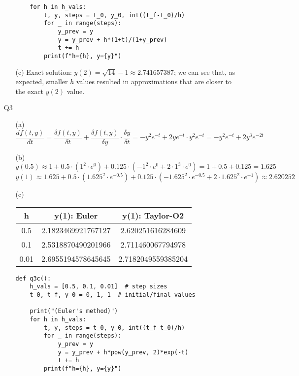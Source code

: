 \documentclass{article}
\begin{document}
\begin{itemize}
\begin{itemize}
\begin{verbatim}
    for h in h_vals:
        t, y, steps = t_0, y_0, int((t_f-t_0)/h)
        for _ in range(steps):
            y_prev = y
            y = y_prev + h*(1+t)/(1+y_prev)
            t += h
        print(f"h={h}, y={y}")
                    \end{verbatim}
              \item [(c)] Exact solution: $y(2)=\sqrt{14}-1\approx 2.741657387$; we can see that, as expected, smaller $h$ values resulted in approximations that are closer to the exact $y(2)$ value.
          \end{itemize}
    \item [Q3]
          \begin{itemize}
              \item [(a)] $\dfrac{df(t,y)}{dt}=\dfrac{\delta f(t,y)}{\delta t}+\dfrac{\delta f(t,y)}{\delta y}\cdot\dfrac{\delta y}{\delta t}=-y^2e^{-t}+2ye^{-t}\cdot y^2e^{-t}=\boxed{-y^2e^{-t}+2y^3e^{-2t}}$
              \item [(b)] $y(0.5)\approx 1+0.5\cdot(1^2\cdot e^0)+0.125\cdot(-1^2\cdot e^0+2\cdot 1^3\cdot e^0)=1+0.5+0.125=1.625$\\$y(1)\approx 1.625+0.5\cdot(1.625^2\cdot e^{-0.5})+0.125\cdot(-1.625^2\cdot e^{-0.5}+2\cdot 1.625^2\cdot e^{-1})\approx\boxed{2.620252}$
              \item [(c)]
                    \begin{tabular}{|c|c|c|}
                        \hline
                        h    & y(1): Euler        & y(1): Taylor-O2    \\
                        \hline
                        0.5  & 2.1823469921767127 & 2.620251616284609  \\
                        \hline
                        0.1  & 2.5318870490201966 & 2.711460067794978  \\
                        \hline
                        0.01 & 2.6955194578645645 & 2.7182049559385204 \\
                        \hline
                    \end{tabular}
                    \begin{verbatim}
def q3c():
    h_vals = [0.5, 0.1, 0.01]  # step sizes
    t_0, t_f, y_0 = 0, 1, 1  # initial/final values

    print("(Euler's method)")
    for h in h_vals:
        t, y, steps = t_0, y_0, int((t_f-t_0)/h)
        for _ in range(steps):
            y_prev = y
            y = y_prev + h*pow(y_prev, 2)*exp(-t)
            t += h
        print(f"h={h}, y={y}")
                    

\end{verbatim}
\end{itemize}
\end{itemize}
\end{document}
